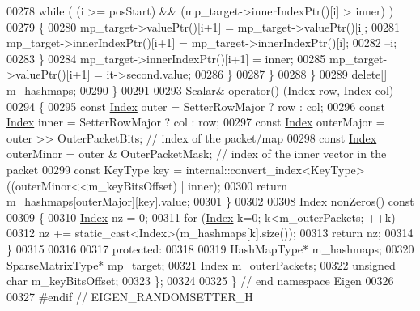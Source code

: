 \begin{DoxyCode}
00278             \textcolor{keywordflow}{while} ( (i >= posStart) && (mp\_target->innerIndexPtr()[i] > inner) )
00279             \{
00280               mp\_target->valuePtr()[i+1] = mp\_target->valuePtr()[i];
00281               mp\_target->innerIndexPtr()[i+1] = mp\_target->innerIndexPtr()[i];
00282               --i;
00283             \}
00284             mp\_target->innerIndexPtr()[i+1] = inner;
00285             mp\_target->valuePtr()[i+1] = it->second.value;
00286           \}
00287         \}
00288       \}
00289       \textcolor{keyword}{delete}[] m\_hashmaps;
00290     \}
00291 
\hyperlink{class_eigen_1_1_random_setter_a77dcbbc964b42027e00af269a5147c68}{00293}     Scalar& operator() (\hyperlink{namespace_eigen_a62e77e0933482dafde8fe197d9a2cfde}{Index} row, \hyperlink{namespace_eigen_a62e77e0933482dafde8fe197d9a2cfde}{Index} col)
00294     \{
00295       \textcolor{keyword}{const} \hyperlink{namespace_eigen_a62e77e0933482dafde8fe197d9a2cfde}{Index} outer = SetterRowMajor ? row : col;
00296       \textcolor{keyword}{const} \hyperlink{namespace_eigen_a62e77e0933482dafde8fe197d9a2cfde}{Index} inner = SetterRowMajor ? col : row;
00297       \textcolor{keyword}{const} \hyperlink{namespace_eigen_a62e77e0933482dafde8fe197d9a2cfde}{Index} outerMajor = outer >> OuterPacketBits; \textcolor{comment}{// index of the packet/map}
00298       \textcolor{keyword}{const} \hyperlink{namespace_eigen_a62e77e0933482dafde8fe197d9a2cfde}{Index} outerMinor = outer & OuterPacketMask;  \textcolor{comment}{// index of the inner vector in the packet}
00299       \textcolor{keyword}{const} KeyType key = internal::convert\_index<KeyType>((outerMinor<<m\_keyBitsOffset) | inner);
00300       \textcolor{keywordflow}{return} m\_hashmaps[outerMajor][key].value;
00301     \}
00302 
\hyperlink{class_eigen_1_1_random_setter_ac34e5cd67e370641c3b48c8a91705046}{00308}     \hyperlink{namespace_eigen_a62e77e0933482dafde8fe197d9a2cfde}{Index} \hyperlink{class_eigen_1_1_random_setter_ac34e5cd67e370641c3b48c8a91705046}{nonZeros}()\textcolor{keyword}{ const}
00309 \textcolor{keyword}{    }\{
00310       \hyperlink{namespace_eigen_a62e77e0933482dafde8fe197d9a2cfde}{Index} nz = 0;
00311       \textcolor{keywordflow}{for} (\hyperlink{namespace_eigen_a62e77e0933482dafde8fe197d9a2cfde}{Index} k=0; k<m\_outerPackets; ++k)
00312         nz += static\_cast<Index>(m\_hashmaps[k].size());
00313       \textcolor{keywordflow}{return} nz;
00314     \}
00315 
00316 
00317   \textcolor{keyword}{protected}:
00318 
00319     HashMapType* m\_hashmaps;
00320     SparseMatrixType* mp\_target;
00321     \hyperlink{namespace_eigen_a62e77e0933482dafde8fe197d9a2cfde}{Index} m\_outerPackets;
00322     \textcolor{keywordtype}{unsigned} \textcolor{keywordtype}{char} m\_keyBitsOffset;
00323 \};
00324 
00325 \} \textcolor{comment}{// end namespace Eigen}
00326 
00327 \textcolor{preprocessor}{#endif // EIGEN\_RANDOMSETTER\_H}
\end{DoxyCode}
